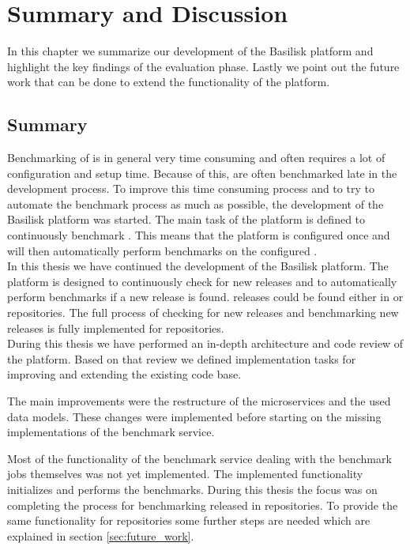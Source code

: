 \chapter{Summary and Discussion}
\label{ch:summary}

In this chapter we summarize our development of the Basilisk platform and highlight the key findings of the evaluation phase.
Lastly we point out the future work that can be done to extend the functionality of the platform.

\section{Summary}
Benchmarking of \tsp{} is in general very time consuming and often requires a lot of configuration and setup time.
Because of this, \tsp{} are often benchmarked late in the development process.
To improve this time consuming process and to try to automate the benchmark process as much as possible, the development of the Basilisk platform was started.
The main task of the platform is defined to continuously benchmark \tsp{}.
This means that the platform is configured once and will then automatically perform benchmarks on the configured \tsp{}.
\\

In this thesis we have continued the development of the Basilisk platform.
The platform is designed to continuously check for new \ts{} releases and to automatically perform benchmarks if a new release is found.
\ts{} releases could be found either in \dockh{} or \gh{} repositories.
The full process of checking for new releases and benchmarking new releases is fully implemented for \dockh{} repositories.
\\

During this thesis we have performed an in-depth architecture and code review of the platform.
Based on that review we defined implementation tasks for improving and extending the existing code base.

The main improvements were the restructure of the microservices and the used data models.
These changes were implemented before starting on the missing implementations of the benchmark service.

Most of the functionality of the benchmark service dealing with the benchmark jobs themselves was not yet implemented.
The implemented functionality initializes and performs the benchmarks.
During this thesis the focus was on completing the process for benchmarking \ts{} released in \dockh{} repositories.
To provide the same functionality for \gh{} repositories some further steps are needed which are explained in section \ref{sec:future_work}.

